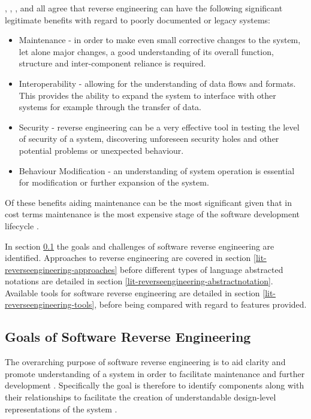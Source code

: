 \cite{chikofsky1990reverse}, \cite{roscoelooking}, \cite{mamas2000towards}, and \cite{rasoolsurvey} all agree that reverse engineering can have the following significant legitimate benefits with regard to poorly documented or legacy systems:
\begin{itemize}
\item Maintenance - in order to make even small corrective changes to the system, let alone major changes, a good understanding of its overall function, structure and inter-component reliance is required.
\item Interoperability - allowing for the understanding of data flows and formats. This provides the ability to expand the system to interface with other systems for example through the transfer of data.
\item Security - reverse engineering can be a very effective tool in testing the level of security of a system, discovering unforeseen security holes and other potential problems or unexpected behaviour.
\item Behaviour Modification - an understanding of system operation is essential for modification or further expansion of the system.
\end{itemize}

Of these benefits aiding maintenance can be the most significant given that in cost terms maintenance is the most expensive stage of the software development lifecycle \citep{meyer2006pattern}.

In section \ref{lit-reverseengineering-goals} the goals and challenges of software reverse engineering are identified. Approaches to reverse engineering are covered in section \ref{lit-reverseengineering-approaches} before different types of language abstracted notations are detailed in section \ref{lit-reverseengineering-abstractnotation}. Available tools for software reverse engineering are detailed in section \ref{lit-reverseengineering-tools}, before being compared with regard to features provided.

\subsection{Goals of Software Reverse Engineering}\label{lit-reverseengineering-goals}

The overarching purpose of software reverse engineering is to aid clarity and promote understanding of a system in order to facilitate maintenance and further development \citep{chikofsky1990reverse}. Specifically the goal is therefore to identify components along with their relationships to facilitate the creation of understandable design-level representations of the system \citep{roscoelooking,chikofsky1990reverse}.

